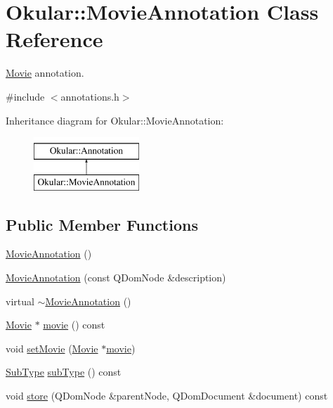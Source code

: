 \hypertarget{classOkular_1_1MovieAnnotation}{\section{Okular\+:\+:Movie\+Annotation Class Reference}
\label{classOkular_1_1MovieAnnotation}
}


\hyperlink{classOkular_1_1Movie}{Movie} annotation.  




{\ttfamily \#include $<$annotations.\+h$>$}

Inheritance diagram for Okular\+:\+:Movie\+Annotation\+:\begin{figure}[H]
\begin{center}
\leavevmode
\includegraphics[height=2.000000cm]{classOkular_1_1MovieAnnotation}
\end{center}
\end{figure}
\subsection*{Public Member Functions}
\begin{DoxyCompactItemize}
\item 
\hyperlink{classOkular_1_1MovieAnnotation_ae7391212e5bf4af61eee7fb5cdb23e6c}{Movie\+Annotation} ()
\item 
\hyperlink{classOkular_1_1MovieAnnotation_aa0942a64837166156b138ee258fc7f59}{Movie\+Annotation} (const Q\+Dom\+Node \&description)
\item 
virtual \hyperlink{classOkular_1_1MovieAnnotation_a6b9043b5eddba53386475c555f57a6d8}{$\sim$\+Movie\+Annotation} ()
\item 
\hyperlink{classOkular_1_1Movie}{Movie} $\ast$ \hyperlink{classOkular_1_1MovieAnnotation_a1fc38e32a1704351c3e5916031be0267}{movie} () const 
\item 
void \hyperlink{classOkular_1_1MovieAnnotation_a76ea2ec20c8d441f1b9e2ce6f1eaf21f}{set\+Movie} (\hyperlink{classOkular_1_1Movie}{Movie} $\ast$\hyperlink{classOkular_1_1MovieAnnotation_a1fc38e32a1704351c3e5916031be0267}{movie})
\item 
\hyperlink{classOkular_1_1Annotation_af71b46e37d5f850b97d5c4de3be9aac0}{Sub\+Type} \hyperlink{classOkular_1_1MovieAnnotation_aca5a1de7a784bb12f321cd16ffa5a0cb}{sub\+Type} () const 
\item 
void \hyperlink{classOkular_1_1MovieAnnotation_a5ec4a8d3b4ba3fdd08256590d7124238}{store} (Q\+Dom\+Node \&parent\+Node, Q\+Dom\+Document \&document) const 
\end{DoxyCompactItemize}
